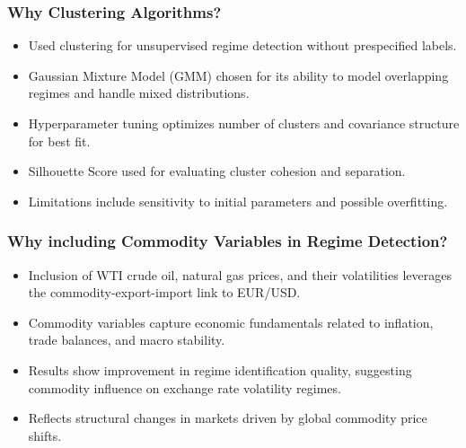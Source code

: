 \begin{frame}
    \frametitle{Why Clustering Algorithms?}
    \scriptsize{
    \begin{itemize}
        \item Used clustering for unsupervised regime detection without prespecified labels.
        \item Gaussian Mixture Model (GMM) chosen for its ability to model overlapping regimes and handle mixed distributions.
        \item Hyperparameter tuning optimizes number of clusters and covariance structure for best fit.
        \item Silhouette Score used for evaluating cluster cohesion and separation.
        \item Limitations include sensitivity to initial parameters and possible overfitting.
    \end{itemize}
    }
\end{frame}
\begin{frame}
    \frametitle{Why including Commodity Variables in Regime Detection?}
    \scriptsize{
    \begin{itemize}
        \item Inclusion of WTI crude oil, natural gas prices, and their volatilities leverages the commodity-export-import link to EUR/USD.
        \item Commodity variables capture economic fundamentals related to inflation, trade balances, and macro stability.
        \item Results show improvement in regime identification quality, suggesting commodity influence on exchange rate volatility regimes.
        \item Reflects structural changes in markets driven by global commodity price shifts.
    \end{itemize}
    }
\end{frame}
